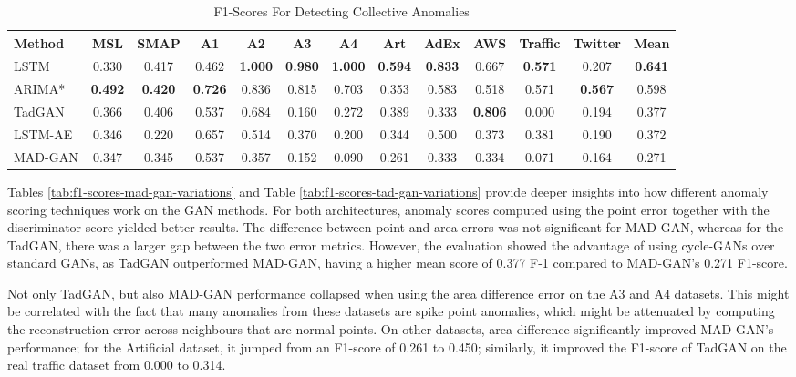 \begin{table}[H]
\centering
\scriptsize
\begin{tabular}{lccccccccccc | c}
\toprule
Method & MSL & SMAP & A1 & A2 & A3 & A4 & Art & AdEx & AWS & Traffic & Twitter & Mean \\
\midrule
LSTM    & 0.330 & 0.417 & 0.462 & \textbf{1.000} & \textbf{0.980} & \textbf{1.000} & \textbf{0.594} & \textbf{0.833} & 0.667 & \textbf{0.571} & 0.207 & \textbf{0.641} \\
ARIMA*   & \textbf{0.492} & \textbf{0.420} & \textbf{0.726} & 0.836 & 0.815 & 0.703 & 0.353 & 0.583 & 0.518 & 0.571 & \textbf{0.567} & 0.598 \\
TadGAN  & 0.366 & 0.406 & 0.537 & 0.684 & 0.160 & 0.272 & 0.389 & 0.333 & \textbf{0.806} & 0.000 & 0.194 & 0.377 \\
LSTM-AE & 0.346 & 0.220 & 0.657 & 0.514 & 0.370 & 0.200 & 0.344 & 0.500 & 0.373 & 0.381 & 0.190 & 0.372 \\
MAD-GAN & 0.347 & 0.345 & 0.537 & 0.357 & 0.152 & 0.090 & 0.261 & 0.333 & 0.334 & 0.071 & 0.164 & 0.271 \\
\bottomrule
\end{tabular}
\caption{\centering F1-Scores For Detecting Collective Anomalies}
\label{tab:f1-scores-all-methods-collective}
\end{table}

Tables \ref{tab:f1-scores-mad-gan-variations} and Table \ref{tab:f1-scores-tad-gan-variations} provide deeper insights into how different anomaly scoring techniques work on the GAN methods. For both architectures, anomaly scores computed using the point error together with the discriminator score yielded better results. The difference between point and area errors was not significant for MAD-GAN, whereas for the TadGAN, there was a larger gap between the two error metrics. However, the evaluation showed the advantage of using cycle-GANs over standard GANs, as TadGAN outperformed MAD-GAN, having a higher mean score of 0.377 F-1 compared to MAD-GAN's 0.271 F1-score.

Not only TadGAN, but also MAD-GAN performance collapsed when using the area difference error on the A3 and A4 datasets. This might be correlated with the fact that many anomalies from these datasets are spike point anomalies, which might be attenuated by computing the reconstruction error across neighbours that are normal points. On other datasets, area difference significantly improved MAD-GAN's performance; for the Artificial dataset, it jumped from an F1-score of 0.261 to 0.450; similarly, it improved the F1-score of TadGAN on the real traffic dataset from 0.000 to 0.314.

